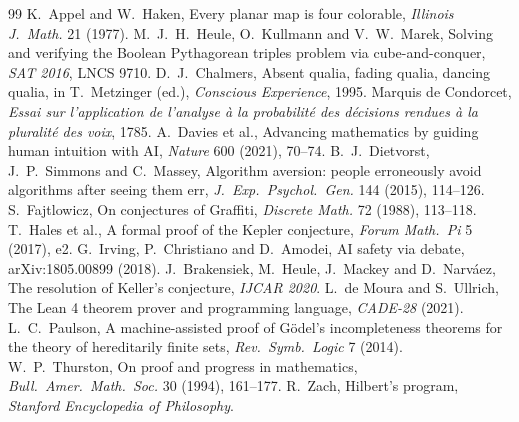 \documentclass[11pt]{article}
\theoremstyle{definition}
\theoremstyle{remark}
\begin{document}
\begin{thebibliography}{99}
 K.~Appel and W.~Haken, Every planar map is four colorable,
\emph{Illinois J.\ Math.} 21 (1977).
 M.~J.~H.~Heule, O.~Kullmann and V.~W.~Marek, Solving and verifying the Boolean
Pythagorean triples problem via cube-and-conquer, \emph{SAT 2016}, LNCS 9710.
 D.~J.~Chalmers, Absent qualia, fading qualia, dancing qualia, in
T.~Metzinger (ed.), \emph{Conscious Experience}, 1995.
 Marquis de Condorcet, \emph{Essai sur l'application de l'analyse \`a la
probabilit\'e des d\'ecisions rendues \`a la pluralit\'e des voix}, 1785.
 A.~Davies et al., Advancing mathematics by guiding human intuition with AI,
\emph{Nature} 600 (2021), 70--74.
 B.~J.~Dietvorst, J.~P.~Simmons and C.~Massey, Algorithm aversion: people
erroneously avoid algorithms after seeing them err, \emph{J.\ Exp.\ Psychol.\ Gen.} 144 (2015),
114--126.
 S.~Fajtlowicz, On conjectures of Graffiti, \emph{Discrete Math.} 72 (1988),
113--118.
 T.~Hales et al., A formal proof of the Kepler conjecture, \emph{Forum Math.\
Pi} 5 (2017), e2.
 G.~Irving, P.~Christiano and D.~Amodei, AI safety via debate,
arXiv:1805.00899 (2018).
 J.~Brakensiek, M.~Heule, J.~Mackey and D.~Narv\'aez, The resolution of
Keller's conjecture, \emph{IJCAR 2020}.
 L.~de Moura and S.~Ullrich, The Lean 4 theorem prover and programming
language, \emph{CADE-28} (2021).
 L.~C.~Paulson, A machine-assisted proof of G\"odel's incompleteness theorems
for the theory of hereditarily finite sets, \emph{Rev.\ Symb.\ Logic} 7 (2014).
\bibitem{thurston} W.~P.~Thurston, On proof and progress in mathematics, \emph{Bull.\ Amer.\
Math.\ Soc.} 30 (1994), 161--177.
\bibitem{zach} R.~Zach, Hilbert's program, \emph{Stanford Encyclopedia of Philosophy}.
\end{thebibliography}
\end{document}
